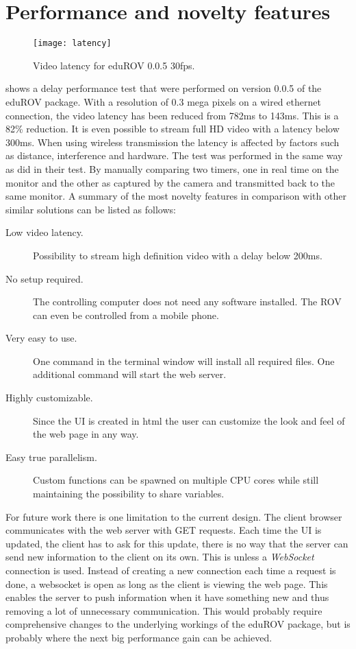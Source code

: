 \section{Performance and novelty features}

\begin{figure}[h!]
    \centering
    \texttt{[image: latency]}
    \caption{Video latency for eduROV 0.0.5 \@ 30fps.}
    \label{latency}
\end{figure}

 shows a delay performance test that were performed on version 0.0.5 of the eduROV package. With a resolution of 0.3 mega pixels on a wired ethernet connection, the video latency has been reduced from 782ms to 143ms. This is a 82\% reduction. It is even possible to stream full HD video with a latency below 300ms. When using wireless transmission the latency is affected by factors such as distance, interference and hardware. The test was performed in the same way as \citet{Jennhag2016} did in their test. By manually comparing two timers, one in real time on the monitor and the other as captured by the camera and transmitted back to the same monitor.
\clearpage
A summary of the most novelty features in comparison with other similar solutions can be listed as follows:

\begin{description}
\item[Low video latency.] Possibility to stream high definition video with a delay below 200ms.

\item[No setup required.] The controlling computer does not need any software installed. The ROV can even be controlled from a mobile phone.

\item[Very easy to use.] One command in the terminal window will install all required files. One additional command will start the web server.

\item[Highly customizable.] Since the UI is created in html the user can customize the look and feel of the web page in any way.

\item[Easy true parallelism.] Custom functions can be spawned on multiple CPU cores while still maintaining the possibility to share variables.
\end{description}

For future work there is one limitation to the current design. The client browser communicates with the web server with GET requests. Each time the UI is updated, the client has to ask for this update, there is no way that the server can send new information to the client on its own. This is unless a \emph{WebSocket} connection is used. Instead of creating a new connection each time a request is done, a websocket is open as long as the client is viewing the web page. This enables the server to push information when it have something new and thus removing a lot of unnecessary communication. This would probably require comprehensive changes to the underlying workings of the eduROV package, but is probably where the next big performance gain can be achieved.